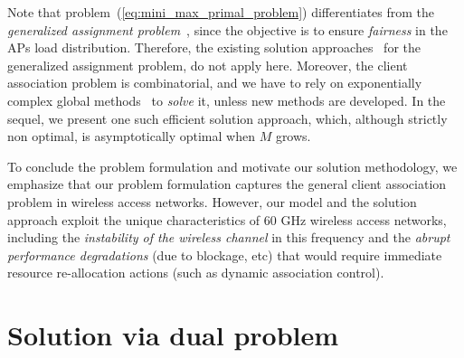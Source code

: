 \documentclass[journal, 10pt, twocolumn]{IEEEtran}
\begin{document}
Note that problem~(\ref{eq:mini_max_primal_problem}) differentiates from the \emph{generalized assignment problem}~\cite[\S~8]{Bertsekas-98}, since the objective is to ensure \emph{fairness} in the APs load distribution. Therefore, the existing solution approaches~\cite[\S~8, \S~10]{Bertsekas-98} for the generalized assignment problem, do not apply here. Moreover, the client association problem is combinatorial, and we have to rely on exponentially complex global methods~\cite{Horst-Pardalos-Toai-00} to \emph{solve} it, unless new methods are developed. In the sequel, we present one such efficient solution approach, which, although strictly non optimal, is asymptotically optimal when $M$ grows. 

To conclude the problem formulation and motivate our solution methodology, we emphasize that our problem formulation captures the general client association problem in wireless access networks. However, our model and the solution approach exploit the unique characteristics of 60 GHz wireless access networks, including the \emph{instability of the wireless channel} in this frequency and the \emph{abrupt performance degradations} (due to blockage, etc) that would require immediate resource re-allocation actions (such as dynamic association control).



\section{Solution via dual problem}\label{sec:dual_prob}
\end{document}
